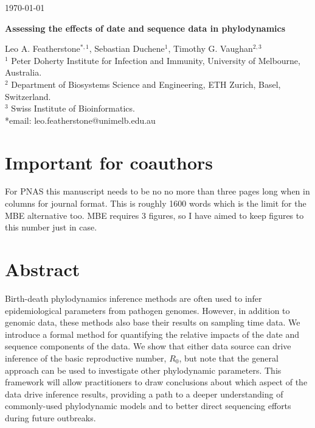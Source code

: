 \documentclass{article}
\begin{document}
\begin{flushright}
\today
\end{flushright}
\begin{center}
\begin{LARGE}
    \textbf{Assessing the effects of date and sequence data in phylodynamics}
\end{LARGE}
\end{center}
Leo A. Featherstone$^{\ast,1}$, Sebastian Duchene$^1$, Timothy G. Vaughan$^{2,3}$\\
$^{1}$ Peter Doherty Institute for Infection and Immunity, University of Melbourne, Australia.\\
$^{2}$ Department of Biosystems Science and Engineering, ETH Zurich, Basel, Switzerland.\\
$^{3}$  Swiss Institute of Bioinformatics.\\
*email: leo.featherstone@unimelb.edu.au
\section*{Important for coauthors}
For PNAS this manuscript needs to be no no more than three pages long when in columns for journal format. This is roughly 1600 words which is the limit for the MBE alternative too. MBE requires 3 figures, so I have aimed to keep figures to this number just in case.
\section*{Abstract}
Birth-death phylodynamics inference methods are often used to infer epidemiological parameters from pathogen genomes.
However, in addition to genomic data, these methods also base their results on sampling time data.
We introduce a formal method for quantifying the relative impacts of the date and sequence components of the data.
We show that either data source can drive inference of the basic reproductive number, $R_0$, but note that the general approach can be used to investigate other phylodynamic parameters. This framework will allow practitioners to draw conclusions about which aspect of the data drive inference results, providing a path to a deeper understanding of commonly-used phylodynamic models and to better direct sequencing efforts during future outbreaks.
\end{document}
